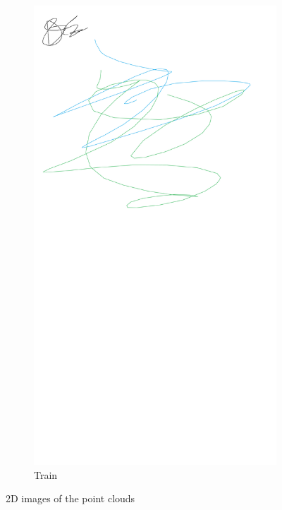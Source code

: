 \documentclass{article}
\begin{document}
\begin{figure}[H]
\begin{subfigure}{0.32\textwidth}
        \includegraphics[width=\textwidth]{train.png}
        \caption{Train}
    \end{subfigure}
    \caption{2D images of the point clouds}
    \label{fig:images}
\end{figure}
\end{document}
